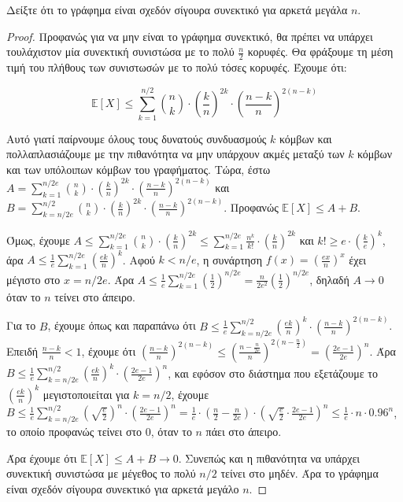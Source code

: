 \documentclass[a4paper, oneside, 11pt]{article}
\theoremstyle{definition}
\newcommand{\ex}{\mathbb{E}}
\begin{document}
\begin{enumerate}
   Δείξτε ότι το γράφημα είναι σχεδόν σίγουρα συνεκτικό για αρκετά μεγάλα $n$.

   \begin{proof}
Προφανώς για να μην είναι το γράφημα συνεκτικό, θα πρέπει να υπάρχει τουλάχιστον μία συνεκτική συνιστώσα με το πολύ $\frac{n}{2}$ κορυφές. Θα φράξουμε τη μέση τιμή του πλήθους των συνιστωσών με το πολύ
τόσες κορυφές. Έχουμε ότι:

\[ \ex[X] \leq \sum_{k=1}^{n/2} {n \choose k} \cdot \left(\frac{k}{n}\right)^{2k} \cdot
\left(\frac{n-k}{n}\right)^{2(n-k)} \]

Αυτό γιατί παίρνουμε όλους τους δυνατούς συνδυασμούς $k$ κόμβων και
πολλαπλασιάζουμε με την πιθανότητα να μην υπάρχουν ακμές μεταξύ των $k$ κόμβων και των υπόλοιπων κόμβων του γραφήματος. Τώρα, έστω $A = \sum_{k=1}^{n/2e} {n\choose k} \cdot (\frac{k}{n})^{2k}
 \cdot (\frac{n-k}{n})^{2(n-k)}$ και $B = \sum_{k=n/2e}^{n/2} {n\choose k} \cdot (\frac{k}{n})^{2k}
 \cdot (\frac{n-k}{n})^{2(n-k)}$.
Προφανώς $\ex[X] \leq A + B$.

Όμως, έχουμε $A \leq \sum_{k=1}^{n/2e} {n\choose k} \cdot (\frac{k}{n})^{2k} \leq \sum_{k=1}^{n/2e} \frac{n^k}{k!} \cdot (\frac{k}{n})^{2k}$ και $k! \geq e \cdot
(\frac{k}{e})^k$, άρα $A \leq \frac{1}{e} \sum_{k=1}^{n/2e} (\frac{ek}{n})^k$. Αφού $k<n/e$, η συνάρτηση $f(x) = (\frac{ex}{n})^x$ έχει μέγιστο στο $x=n/2e$. Άρα $A \leq  \frac{1}{e} \sum_{k=1}^{n/2e}
(\frac{1}{2})^{n/2e} = \frac{n}{2e^2} (\frac{1}{2})^{n/2e}$, δηλαδή $A\rightarrow 0$ όταν το $n$ τείνει στο άπειρο.

Για το $B$, έχουμε όπως και παραπάνω ότι $B\leq \frac{1}{e} \sum_{k=n/2e}^{n/2} (\frac{ek}{n})^k \cdot (\frac{n-k}{n})^{2(n-k)}$. Επειδή $\frac{n-k}{n}<1$, έχουμε ότι $(\frac{n-k}{n})^{2(n-k)}
\leq (\frac{n-\frac{n}{2e}}{n})^{2(n-\frac{n}{2})} = (\frac{2e-1}{2e})^n$. Άρα $B \leq \frac{1}{e} \sum_{k=n/2e}^{n/2} (\frac{ek}{n})^k \cdot (\frac{2e-1}{2e})^n$, και εφόσον στο διάστημα που εξετάζουμε
το $(\frac{ek}{n})^k$ μεγιστοποιείται για $k=n/2$, έχουμε $B \leq \frac{1}{e} \sum_{k=n/2e}^{n/2} (\sqrt{\frac{e}{2}})^n \cdot (\frac{2e-1}{2e})^n = \frac{1}{e} \cdot (\frac{n}{2} - \frac{n}{2e}) \cdot
(\sqrt{\frac{e}{2}}\cdot \frac{2e-1}{2e})^n \leq \frac{1}{e} \cdot n \cdot 0.96^n$, το οποίο προφανώς τείνει στο 0, όταν το $n$ πάει στο άπειρο.

Άρα έχουμε ότι $\ex[X]\leq A + B \rightarrow 0$. Συνεπώς
και η πιθανότητα να υπάρχει συνεκτική συνιστώσα με μέγεθος το πολύ $n/2$ τείνει στο μηδέν. Άρα το γράφημα είναι σχεδόν σίγουρα συνεκτικό για αρκετά μεγάλο $n$.


   \end{proof}

\end{enumerate}
\end{document}
